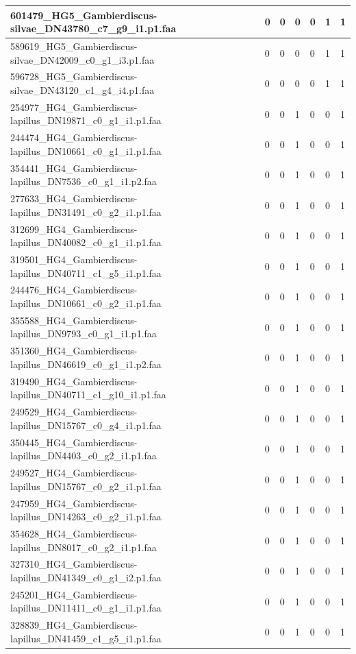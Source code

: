 \documentclass[12pt]{article}
\begin{document}
\begin{longtable}{ | p{2cm} | p{2cm} |p{2.5cm} | p{2cm} | p{2.5cm} |  p{2cm} | p{2cm} |}
 \hline 
601479\_HG5\_Gambierdiscus-silvae\_DN43780\_c7\_g9\_i1.p1.faa&0&0&0&0&1&1\\ 
 \hline 
589619\_HG5\_Gambierdiscus-silvae\_DN42009\_c0\_g1\_i3.p1.faa&0&0&0&0&1&1\\ 
 \hline 
596728\_HG5\_Gambierdiscus-silvae\_DN43120\_c1\_g4\_i4.p1.faa&0&0&0&0&1&1\\ 
 \hline 
254977\_HG4\_Gambierdiscus-lapillus\_DN19871\_c0\_g1\_i1.p1.faa&0&0&1&0&0&1\\ 
 \hline 
244474\_HG4\_Gambierdiscus-lapillus\_DN10661\_c0\_g1\_i1.p1.faa&0&0&1&0&0&1\\ 
 \hline 
354441\_HG4\_Gambierdiscus-lapillus\_DN7536\_c0\_g1\_i1.p2.faa&0&0&1&0&0&1\\ 
 \hline 
277633\_HG4\_Gambierdiscus-lapillus\_DN31491\_c0\_g2\_i1.p1.faa&0&0&1&0&0&1\\ 
 \hline 
312699\_HG4\_Gambierdiscus-lapillus\_DN40082\_c0\_g1\_i1.p1.faa&0&0&1&0&0&1\\ 
 \hline 
319501\_HG4\_Gambierdiscus-lapillus\_DN40711\_c1\_g5\_i1.p1.faa&0&0&1&0&0&1\\ 
 \hline 
244476\_HG4\_Gambierdiscus-lapillus\_DN10661\_c0\_g2\_i1.p1.faa&0&0&1&0&0&1\\ 
 \hline 
355588\_HG4\_Gambierdiscus-lapillus\_DN9793\_c0\_g1\_i1.p1.faa&0&0&1&0&0&1\\ 
 \hline 
351360\_HG4\_Gambierdiscus-lapillus\_DN46619\_c0\_g1\_i1.p2.faa&0&0&1&0&0&1\\ 
 \hline 
319490\_HG4\_Gambierdiscus-lapillus\_DN40711\_c1\_g10\_i1.p1.faa&0&0&1&0&0&1\\ 
 \hline 
249529\_HG4\_Gambierdiscus-lapillus\_DN15767\_c0\_g4\_i1.p1.faa&0&0&1&0&0&1\\ 
 \hline 
350445\_HG4\_Gambierdiscus-lapillus\_DN4403\_c0\_g2\_i1.p1.faa&0&0&1&0&0&1\\ 
 \hline 
249527\_HG4\_Gambierdiscus-lapillus\_DN15767\_c0\_g2\_i1.p1.faa&0&0&1&0&0&1\\ 
 \hline 
247959\_HG4\_Gambierdiscus-lapillus\_DN14263\_c0\_g2\_i1.p1.faa&0&0&1&0&0&1\\ 
 \hline 
354628\_HG4\_Gambierdiscus-lapillus\_DN8017\_c0\_g2\_i1.p1.faa&0&0&1&0&0&1\\ 
 \hline 
327310\_HG4\_Gambierdiscus-lapillus\_DN41349\_c0\_g1\_i2.p1.faa&0&0&1&0&0&1\\ 
 \hline 
245201\_HG4\_Gambierdiscus-lapillus\_DN11411\_c0\_g1\_i1.p1.faa&0&0&1&0&0&1\\ 
 \hline 
328839\_HG4\_Gambierdiscus-lapillus\_DN41459\_c1\_g5\_i1.p1.faa&0&0&1&0&0&1\\ 

\end{longtable}
\end{document}
